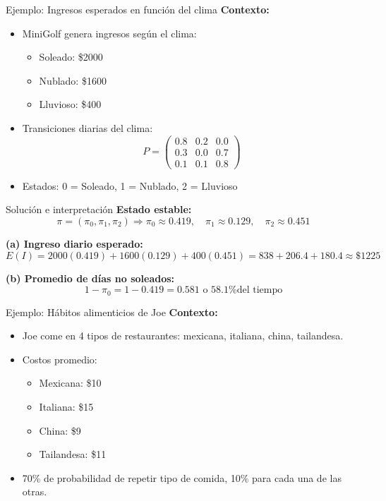 \documentclass{beamer}
\begin{document}
\begin{frame}{Ejemplo: Ingresos esperados en función del clima}
\textbf{Contexto:}
\begin{itemize}
  \item MiniGolf genera ingresos según el clima: 
  \begin{itemize}
    \item Soleado: \$2000
    \item Nublado: \$1600
    \item Lluvioso: \$400
  \end{itemize}
  \item Transiciones diarias del clima:
  \[
  P = \begin{pmatrix}
  0.8 & 0.2 & 0.0 \\
  0.3 & 0.0 & 0.7 \\
  0.1 & 0.1 & 0.8
  \end{pmatrix}
  \]
  \item Estados: 0 = Soleado, 1 = Nublado, 2 = Lluvioso
\end{itemize}
\end{frame}

\begin{frame}{Solución e interpretación}
\textbf{Estado estable:}
\[
\pi = (\pi_0, \pi_1, \pi_2) \Rightarrow \pi_0 \approx 0.419, \quad \pi_1 \approx 0.129, \quad \pi_2 \approx 0.451
\]

\textbf{(a) Ingreso diario esperado:}
\[
E(I) = 2000(0.419) + 1600(0.129) + 400(0.451) = 838 + 206.4 + 180.4 \approx \boxed{\$1225}
\]

\textbf{(b) Promedio de días no soleados:}
\[
1 - \pi_0 = 1 - 0.419 = \boxed{0.581} \text{ o 58.1\% del tiempo}
\]
\end{frame}

\begin{frame}{Ejemplo: Hábitos alimenticios de Joe}
\textbf{Contexto:}
\begin{itemize}
  \item Joe come en 4 tipos de restaurantes: mexicana, italiana, china, tailandesa.
  \item Costos promedio: 
  \begin{itemize}
    \item Mexicana: \$10
    \item Italiana: \$15
    \item China: \$9
    \item Tailandesa: \$11
  \end{itemize}
  \item 70\% de probabilidad de repetir tipo de comida, 10\% para cada una de las otras.
\end{itemize}
\end{frame}
\end{document}

